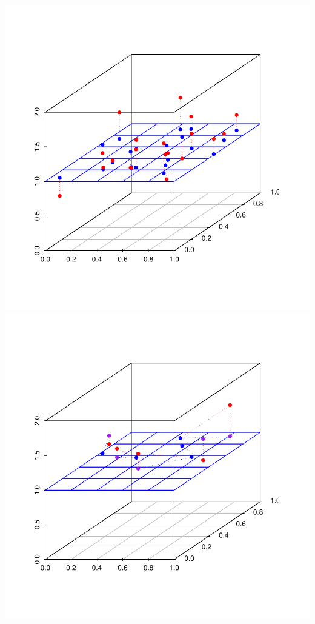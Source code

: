 \documentclass[landscape,footrule]{foils}
\begin{document}
\begin{center}
\includegraphics[scale=0.55]{low-dimensional-data-i.pdf}
\includegraphics[scale=0.55]{low-dimensional-data-ii.pdf}
\end{center}\vspace*{-1cm}
\end{document}
